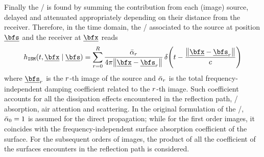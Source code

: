 


\mynewline
Finally the \RIR/ is found by summing the contribution from each (image) source, delayed and attenuated appropriately depending on their distance from the receiver.
Therefore, in the time domain, the \RIR/ associated to the source at position $\positionSource$ and the receiver at $\positionMicrophone$ reads
\begin{equation}\label{eq:acoustics:ims:time}
    \rir_{\mathtt{ISM}}(t, \positionMicrophone \mid \positionSource) =
    \sum_{\idxEch=0}^{\numEchs}
        \frac{\bar{\absCoeff}_{\idxEch}}{4 \pi \norm{\positionMicrophone - \positionSource_\idxEch}}
        \diracOf{t - \frac{\norm{\positionMicrophone - \positionSource_\idxEch}}{\speedOfSound}}
\end{equation}
where $\positionSource_\idxEch$ is the $r$-th image of the source and $\bar{\alpha}_{r}$
is the total frequency-independent damping coefficient related to the $r$-th image.
Such coefficient accounts for all the dissipation effects encountered in the reflection path, \eg/ absorption, air attention and scattering.
In the original formulation of the \ISM/, $\bar{\alpha}_{0} = 1$ is assumed for the direct propagation;
while for the first order images, it coincides with the frequency-independent surface absorption coefficient of the surface.
For the subsequent orders of images, the product of all the coefficient of the surfaces encounters in the reflection path is considered.

